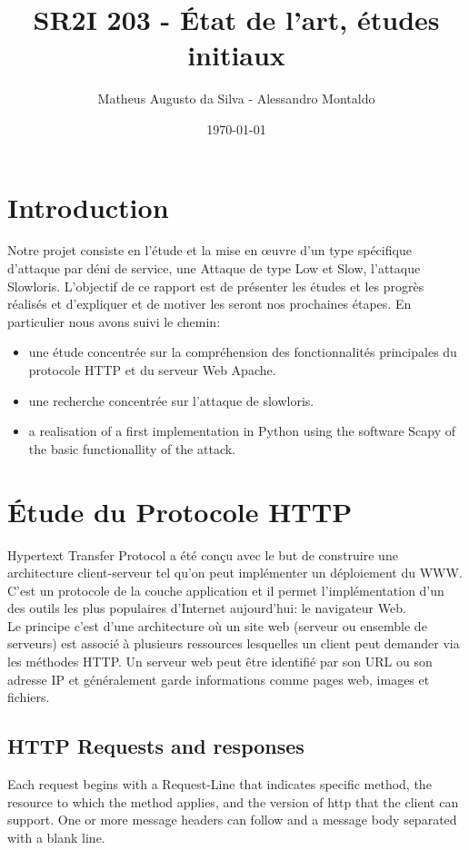 \documentclass{article}
\author{Matheus Augusto da Silva - Alessandro Montaldo}
\title{\textbf{SR2I 203 - État de l'art, études initiaux}}
\date{\today}
\begin{document}
\maketitle

\section{Introduction}
Notre projet consiste en l’étude et la mise en œuvre d’un type spécifique d’attaque par déni de service, une
Attaque de type Low et Slow, l’attaque Slowloris. L’objectif de ce rapport est de présenter les études et les progrès réalisés et d’expliquer et de motiver les
seront nos prochaines étapes. En particulier nous avons suivi le chemin: \\

\begin{itemize}
	\item une étude concentrée sur la compréhension des fonctionnalités principales du protocole HTTP et du serveur Web Apache.
	\item une recherche concentrée sur l'attaque de slowloris.
	\item a realisation of a first implementation in Python using the software Scapy of the basic functionallity of the attack.
\end{itemize}


\section{Étude du Protocole HTTP}
Hypertext Transfer Protocol a été conçu avec le but de construire une architecture client-serveur tel qu'on peut implémenter un déploiement du WWW. C'est un protocole de la couche application et il permet l'implémentation d'un des outils les plus populaires d'Internet aujourd'hui: le navigateur Web. \\
Le principe c'est d'une architecture où un site web (serveur ou ensemble de serveurs) est associé à plusieurs ressources lesquelles un client peut demander via les méthodes HTTP. Un serveur web peut être identifié par son URL ou son adresse IP et généralement garde informations comme pages web, images et fichiers.

\subsection{HTTP Requests and responses}
Each request begins with a Request-Line that indicates specific method, the resource to which the method applies, and the version of http that the client can support. One or more message headers can follow and a message body separated with a blank line. \\
\end{document}
